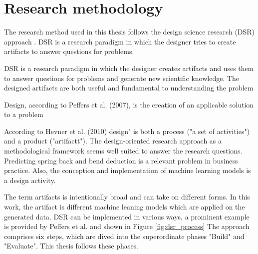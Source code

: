 \chapter{Research methodology} 

The research method used in this thesis follows the design science research (DSR) approach 
\cite[p. 17]{rennenkampff_managementitagilitaetentwicklung_2015}. 
DSR is a research paradigm in which the designer tries to create artifacts to answer questions for problems.


DSR is a research paradigm in which the designer creates artifacts and uses them to answer questions for problems and generate new scientific knowledge. 
The designed artifacts are both useful and fundamental to understanding the problem \cite[p. 10]{hevner_designscienceresearch_2010}

Design, according to Peffers et al. (2007), is the creation of an applicable solution to a problem \cite[p.47]{peffers_designscienceresearch_2007}

According to Hevner et al. (2010)
design" is both a process ("a set of activities") and a product ("artifactt"). \cite[p.78]{hevner_designscienceresearch_2010}
The design-oriented research approach as a methodological framework seems well suited to answer the research questions.
Predicting spring back and bend deduction is a relevant problem in business practice. 
Also, the conception and implementation of machine learning models is a design activity. 


The term artifacts is intentionally broad and can take on different forms. In this work, the artifact is different machine leaning models which are applied on the generated data. 
DSR can be implemented in various ways, a prominent example is provided by Peffers et al. and shown in Figure \ref{fig:dsr_process}
The approach comprises six steps, which are dived into the superordinate phases "Build" and "Evaluate". This thesis follows these phases.

